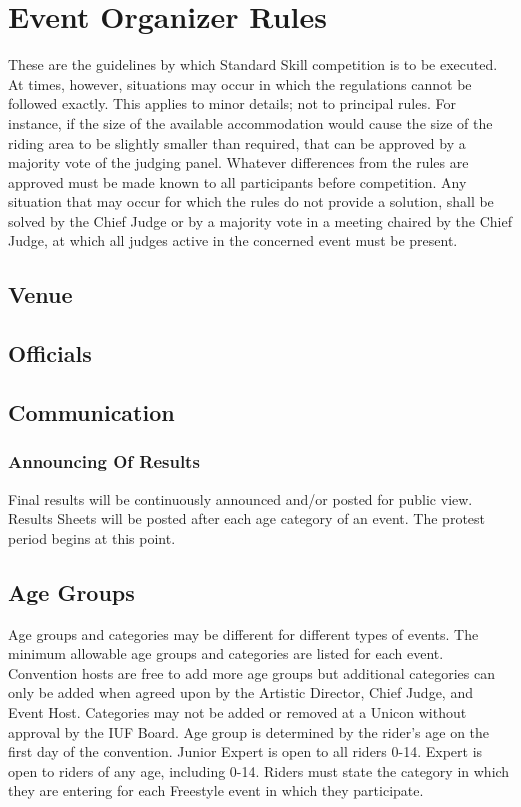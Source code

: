 \chapter{Event Organizer Rules}

These are the guidelines by which Standard Skill competition is to be executed.
At times, however, situations may occur in which the regulations cannot be followed exactly.
This applies to minor details; not to principal rules.
For instance, if the size of the available accommodation would cause the size of the riding area to be slightly smaller than required, that can be approved by a majority vote of the judging panel.
Whatever differences from the rules are approved must be made known to all participants before competition.
Any situation that may occur for which the rules do not provide a solution, shall be solved by the Chief Judge or by a majority vote in a meeting chaired by the Chief Judge, at which all judges active in the concerned event must be present.

\section{Venue}
\section{Officials}
\section{Communication}

\subsection{Announcing Of Results}

Final results will be continuously announced and/or posted for public view.
Results Sheets will be posted after each age category of an event.
The protest period begins at this point.


\section{Age Groups}

Age groups and categories may be different for different types of events.
The minimum allowable age groups and categories are listed for each event.
Convention hosts are free to add more age groups but additional categories can only be added when agreed upon by the Artistic Director, Chief Judge, and Event Host.
Categories may not be added or removed at a Unicon without approval by the IUF Board.
Age group is determined by the rider's age on the first day of the convention.
Junior Expert is open to all riders 0-14.
Expert is open to riders of any age, including 0-14.
Riders must state the category in which they are entering for each Freestyle event in which they participate.

